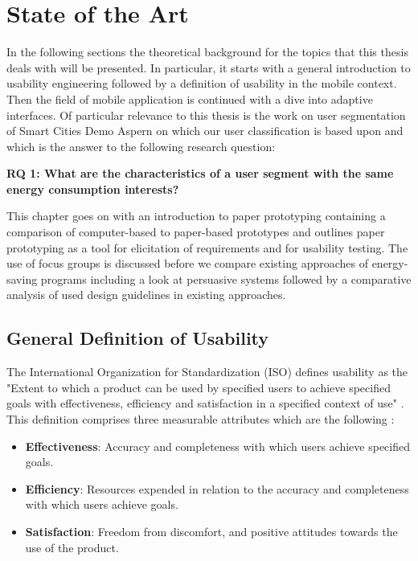 \chapter{State of the Art}

In the following sections the theoretical background for the topics that this thesis deals with will be presented. In particular, it starts with a general introduction to usability engineering followed by a definition of usability in the mobile context. Then the field of mobile application is continued with a dive into adaptive interfaces. Of particular relevance to this thesis is the work on user segmentation of Smart Cities Demo Aspern on which our user classification is based upon and which is the answer to the following research question:

\textbf{RQ 1: What are the characteristics of a user segment with the same energy consumption interests?}

This chapter goes on with an introduction to paper prototyping containing a comparison of computer-based to paper-based prototypes and outlines paper prototyping as a tool for elicitation of requirements and for usability testing. The use of focus groups is discussed before we compare existing approaches of energy-saving programs including a look at persuasive systems followed by a comparative analysis of used design guidelines in existing approaches.

\section{General Definition of Usability}

The International Organization for Standardization (ISO) defines usability as the "Extent to which a product can be used by specified users to achieve specified goals with effectiveness, efficiency and satisfaction in a specified context of use" \cite{bevan1998iso}. This definition comprises three measurable attributes which are the following \cite{din19989241}:

\begin{itemize}
	\item \textbf{Effectiveness}: Accuracy and completeness with which users achieve specified goals.
	\item \textbf{Efficiency}: Resources expended in relation to the accuracy and completeness with which users achieve goals.	
	\item \textbf{Satisfaction}: Freedom from discomfort, and positive attitudes towards the use of the product.
\end{itemize}

